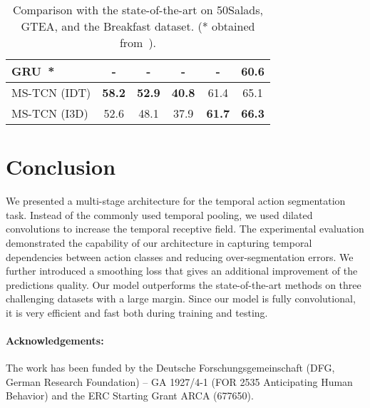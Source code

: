 \documentclass[10pt,twocolumn,letterpaper]{article}
\begin{document}
\begin{table}[tb]
{\begin{tabular}{lccccc}
GRU~\cite{richard2017weakly}* &          -    &          -    &          -    &          -    &         60.6  \\ 
\hline
MS-TCN (IDT)                  & \textbf{58.2} & \textbf{52.9} & \textbf{40.8} &         61.4  &         65.1  \\      
MS-TCN (I3D)                  &         52.6  &         48.1  &         37.9  & \textbf{61.7} & \textbf{66.3} \\      
\hline
\end{tabular}}
\caption{Comparison with the state-of-the-art on 50Salads, GTEA, and the Breakfast dataset. (* obtained from~\cite{ding2018weakly}).}
\label{tab:state_of_the_art}
\vspace{-4mm}
\end{table}

\section{Conclusion}

We presented a multi-stage architecture for the temporal action segmentation task. 
Instead of the commonly used temporal pooling, we used dilated convolutions to increase 
the temporal receptive field. The experimental evaluation demonstrated the capability of 
our architecture in capturing temporal dependencies between action classes and reducing 
over-segmentation errors. We further introduced a smoothing loss that gives an additional 
improvement of the predictions quality. Our model outperforms the state-of-the-art methods 
on three challenging datasets with a large margin. Since our model is fully convolutional, 
it is very efficient and fast both during training and testing.

\paragraph{Acknowledgements:} The work has been funded by the Deutsche Forschungsgemeinschaft (DFG, German Research Foundation) – GA 1927/4-1 (FOR 2535 Anticipating Human Behavior) and the ERC Starting Grant ARCA (677650).


{\small


}
\end{document}
